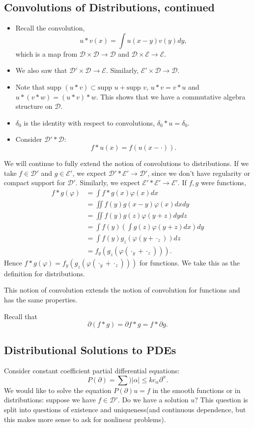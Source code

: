\documentclass[12pt]{scrartcl}
\let \phi \varphi
\newcommand{\supp}{\text{supp }}
\begin{document}
\subsection{Convolutions of Distributions, continued}
\begin{itemize}
\item Recall the convolution,
$$u * v(x) = \int u(x-y) v(y)dy,$$
which is a map from $\mathcal D \times \mathcal D \rightarrow \mathcal D$ and $\mathcal D \times \mathcal E \rightarrow \mathcal E$.  
\item We also saw that $\mathcal D' \times \mathcal D \rightarrow \mathcal E$.  Similarly, 
$\mathcal E' \times \mathcal D \rightarrow \mathcal D.$
\item Note that $\supp(u * v) \subset \supp u + \supp v$, $u * v = v * u$ and $u*(v*w) = (u*v)*w$.  This shows that we have a commutative algebra structure on $\mathcal D$.
\item $\delta_0$ is the identity with respect to convolutions, $\delta_0 * u = \delta_0$.
\item Consider $\mathcal D' * \mathcal D:$
$$f*u(x) = f(u(x - \cdot)).$$
\end{itemize}
We will continue to fully extend the notion of convolutions to distributions.  If we take $f \in \mathcal D'$ and $g \in \mathcal E'$, we expect $\mathcal D' * \mathcal E' \rightarrow \mathcal D'$, since we don't have regularity or compact support for $\mathcal D'$.  Similarly, we expect $\mathcal E' * \mathcal E' \rightarrow \mathcal E'$.
If $f, g$ were functions,
\begin{align*}
f*g(\phi) &= \int f * g(x)\phi(x)dx\\
&= \iint f(y)g(x-y)\phi(x)dxdy \\
&= \iint f(y)g(z)\phi(y+z) dydz\\
&= \int f(y)\left (\int g(z)\phi(y+z)dx \right )dy\\
&=\int f(y) g_z(\phi(y + \cdot_z)) dz \\ 
&= f_y(g_z(\phi(\cdot_y + \cdot_z))).
\end{align*}
Hence $f*g(\phi) = f_y(g_z(\phi(\cdot_y + \cdot_z)))$ for functions.  We take this as the definition for distributions.
\begin{proposition} This notion of convolution extends the notion of convolution for functions and has the same properties.

Recall that $$\partial (f*g) = \partial f * g = f * \partial g.$$
\end{proposition}
\subsection{Distributional Solutions to PDEs}
Consider constant coefficient partial differential equations:
$$P(\partial) = \sum){|\alpha| \le k} c_\alpha \partial^\alpha.$$
We would like to solve the equation $P(\partial)u = f$ in the smooth functions or in distributions: suppose we have $f \in \mathcal D'$.  Do we have a solution $u$?  This question is split into questions of existence and uniqueness(and continuous dependence, but this makes more sense to ask for nonlinear problems).
\end{document}
